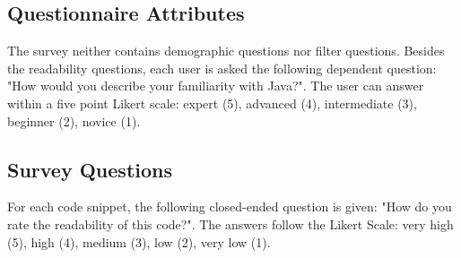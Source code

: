 \documentclass[%
class=scrreprt,
chapterprefix=false,%
open=right,%
twoside=false,%
paper=a4,%
logofile={Logo\_zentral\_farbig\_EN.png},%
thesistype=masterproposal,%
UKenglish,%
]{se2thesis}
\begin{document}
\subsection{Questionnaire Attributes} \label{questionnaire-attributes}
The survey neither contains demographic questions nor filter questions. Besides the readability questions, each user is asked the following dependent question: "How would you describe your familiarity with Java?". The user can answer within a five point Likert scale: expert (5), advanced (4), intermediate (3), beginner (2), novice (1).

	
	
	
	
	


\subsection{Survey Questions} %
For each code snippet, the following closed-ended question is given: "How do you rate the readability of this code?". The answers follow the Likert Scale: very high (5), high (4), medium (3), low (2), very low (1).
\end{document}
